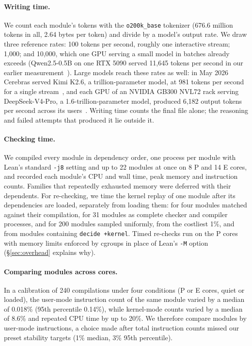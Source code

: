 \documentclass[10pt,twocolumn]{article}
\newcommand{\dk}{\texttt{decide +kernel}}
\newcommand{\SampleN}{200}
\begin{document}
\paragraph{Writing time.}
We count each module's tokens with the \texttt{o200k\_base} tokenizer
(676.6 million tokens in all, 2.64 bytes per token) and divide by a model's
output rate. We draw three reference rates: 100 tokens
per second, roughly one interactive stream; 1,000; and 10,000, which one GPU
serving a small model in batches already exceeds (Qwen2.5-0.5B on one RTX
5090 served 11,645 tokens per second in our earlier
measurement~\cite{bpfGpuServer2026}). Large models reach these rates as well: in
May 2026 Cerebras served Kimi K2.6, a trillion-parameter model, at 981
tokens per second for a single stream~\cite{cerebrasKimi2026}, and each GPU
of an NVIDIA GB300 NVL72 rack serving DeepSeek-V4-Pro, a
1.6-trillion-parameter model, produced 6,182 output tokens per second across
its users~\cite{semianalysisDsv4Pro2026}. Writing time counts the final file
alone; the reasoning and failed attempts that produced it lie outside it.

\paragraph{Checking time.}
We compiled every module in dependency order, one process per module with
Lean's standard \texttt{-j8} setting and up to 22 modules at once on 8 P
and 14 E cores, and
recorded each module's CPU and wall time, peak memory and instruction
counts. Families that repeatedly exhausted memory were deferred with their
dependents. For re-checking, we time the kernel replay of one module after
its dependencies are loaded, separately from loading them: for four
modules matched against their compilation, for 31 modules as complete
checker and compiler processes, and for \SampleN{} modules sampled
uniformly, from the costliest 1\%, and from modules containing \dk.
Timed re-checks run on the P cores with memory limits enforced by cgroups
in place of Lean's \texttt{-M} option (\S\ref{sec:overhead} explains why).

\paragraph{Comparing modules across cores.}
In a calibration of 240 compilations under four conditions (P or E cores,
quiet or loaded), the user-mode instruction count of the same module
varied by a median of 0.018\% (95th percentile 0.14\%), while kernel-mode
counts varied by a median of 8.6\% and repeated CPU time by up to 20\%.
We therefore compare modules by user-mode instructions, a choice made after
total instruction counts missed our preset stability targets (1\% median,
3\% 95th percentile).
\end{document}
